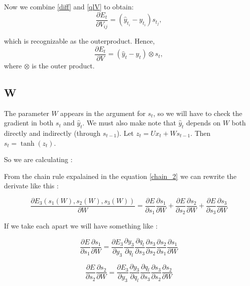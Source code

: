 \documentclass[11pt,twoside]{article}
\begin{document}
\noindent Now we combine \eqref{diff} and \eqref{qlV} to obtain:
\begin{equation}
\frac{\partial E_t}{\partial V_{i j}}=\left(\hat{y}_{t_i}-y_{t_i}\right) s_{t_j},
\end{equation}

\noindent which is recognizable as the outerproduct. Hence,
\begin{equation}
\frac{\partial E_t}{\partial V}=\left(\hat{y}_t-y_t\right) \otimes s_t,
\end{equation}
\noindent where $\otimes$ is the outer product.

\subsection{W}
The parameter $W$ appears in the argument for $s_t$, so we will have to check the gradient in both $s_t$ and $\hat{y}_t$. We must also make note that $\hat{y}_t$ depends on $W$ both directly and indirectly (through $s_{t-1}$). Let $z_t=Ux_t+Ws_{t-1}$. Then $s_t=\tanh(z_t)$.

\noindent So we are calculating : 

From the chain rule expalained in the equation \eqref{chain_2} we can rewrite the derivate like this :

\begin{equation}
    \label{error_with_w}
    \frac{\partial E_3(s_1(W), s_2(W), s_3(W))}{\partial W} = \frac{\partial E}{\partial s_1}\frac{\partial s_1}{\partial W} + \frac{\partial E}{\partial s_2}\frac{\partial s_2}{\partial W} + \frac{\partial E}{\partial s_3}\frac{\partial s_3}{\partial W}
\end{equation}

If we take each apart we will have something like :

\begin{equation}
    \frac{\partial E}{\partial s_1}\frac{\partial s_1}{\partial W} = 
    \frac{\partial E_3}{\partial y_3} \frac{\partial y_3}{\partial q_l} \frac{\partial q_l}{\partial s_3} \frac{\partial s_3}{\partial s_2}\frac{\partial s_2}{\partial s_1}\frac{\partial s_1}{\partial W}  
\end{equation}

\begin{equation}
    \frac{\partial E}{\partial s_2}\frac{\partial s_2}{\partial W} = 
    \frac{\partial E_3}{\partial y_3} \frac{\partial y_3}{\partial q_l} \frac{\partial q_l}{\partial s_3} \frac{\partial s_3}{\partial s_2}\frac{\partial s_2}{\partial W}  
\end{equation}
\end{document}
